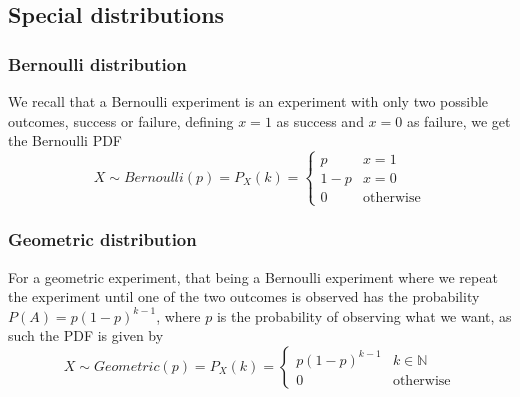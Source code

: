 \subsection{Special distributions}
\subsubsection{Bernoulli distribution}
We recall that a Bernoulli experiment is an experiment with only two possible outcomes, success or failure, defining $x=1$ as success and $x=0$ as failure, we get the Bernoulli PDF
\[
    X\sim Bernoulli(p)=P_{X}(k)=\begin{cases}p & x=1 \\ 1-p & x=0 \\ 0 & \text{otherwise}\end{cases}
\]
\subsubsection{Geometric distribution}
For a geometric experiment, that being a Bernoulli experiment where we repeat the experiment until one of the two outcomes is observed has the probability $P(A)=p(1-p)^{k-1}$, where $p$ is the probability of observing what we want, as such the PDF is given by
\[
    X\sim Geometric(p)=P_{X}(k)=\begin{cases}p(1-p)^{k-1} & k\in \mathbb{N} \\ 0 & \text{otherwise}\end{cases}
\]
